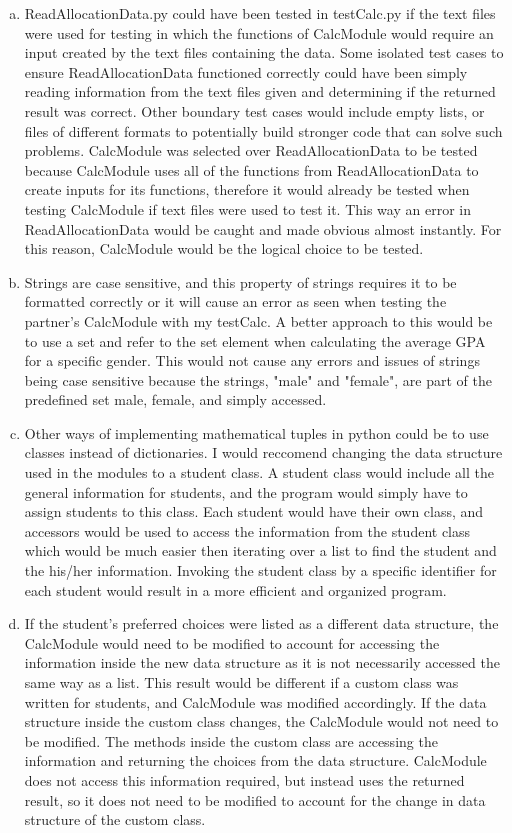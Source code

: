 \documentclass[12pt]{article}
\begin{document}
\begin{enumerate}[(a)]
\item ReadAllocationData.py could have been tested in testCalc.py if the text files were used for testing in which the functions of CalcModule would 
require an input created by the text files containing the data. Some isolated test cases to ensure ReadAllocationData functioned correctly could 
have been simply reading information from the text files given and determining if the returned result was correct. Other boundary test cases would 
include empty lists, or files of different formats to potentially build stronger code that can solve such problems. CalcModule was selected over 
ReadAllocationData to be tested because CalcModule uses all of the functions from ReadAllocationData to create inputs for its functions, therefore it 
would already be tested when testing CalcModule if text files were used to test it. This way an error in ReadAllocationData would be caught and made 
obvious almost instantly. For this reason, CalcModule would be the logical choice to be tested.

\item Strings are case sensitive, and this property of strings requires it to be formatted correctly or it will cause an error as seen when testing 
the partner's CalcModule with my testCalc. A better approach to this would be to use a set and refer to the set element when calculating the average 
GPA for a specific gender. This would not cause any errors and issues of strings being case sensitive because the strings, "male" and "female", are part
of the predefined set {male, female}, and simply accessed.

\item Other ways of implementing mathematical tuples in python could be to use classes instead of dictionaries. I would reccomend changing the 
data structure used in the modules to a student class. A student class would include all the general information for students, and the program would
simply have to assign students to this class. Each student would have their own class, and accessors would be used to access the information from the 
student class which would be much easier then iterating over a list to find the student and the his/her information. Invoking the student class by a 
specific identifier for each student would result in a more efficient and organized program. 

\item If the student's preferred choices were listed as a different data structure, the CalcModule would need to be modified to account for accessing the
information inside the new data structure as it is not necessarily accessed the same way as a list. This result would be different if a custom class
was written for students, and CalcModule was modified accordingly. If the data structure inside the custom class changes, the CalcModule would not need to be modified. 
The methods inside the custom class are accessing the information and returning the choices from the data structure. CalcModule does not access this information required, 
but instead uses the returned result, so it does not need to be modified to account for the change in data structure of the custom class.


\end{enumerate}
\end{document}
